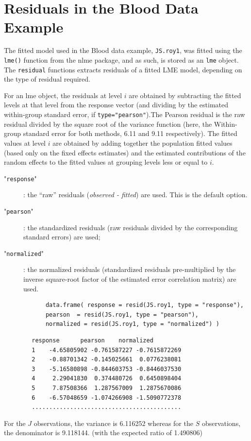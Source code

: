 \documentclass[12pt, a4paper]{report}
\theoremstyle{plain}
\theoremstyle{definition}
\theoremstyle{remark}
\begin{document}
		\section{Residuals in the Blood Data Example}
		The fitted model used in the Blood data example, \texttt{JS.roy1}, was fitted using the \texttt{lme()} function from the nlme package, and as such, is stored as an \texttt{lme} object. The \texttt{residual} functions extracts residuals of a fitted LME model, depending on the type of residual required.
		
		For an lme object, the residuals at level $i$ are obtained by subtracting the fitted levels at that level from the response vector (and dividing by the estimated within-group standard error, if \texttt{type="pearson"}).The Pearson residual is the raw residual divided by the square root of the variance function (here, the Within-group standard error for both methods, 6.11 and 9.11 respectively). The fitted values at level $i$ are obtained by adding together the population fitted values (based only on the fixed effects estimates) and the estimated contributions of the random effects to the fitted values at grouping levels less or equal to $i$.
		
		\begin{description}
			\item["\texttt{response}"]: the “raw” residuals (\textit{observed - fitted}) are used. This is the default option.
			\item["\texttt{pearson}"]: the standardized residuals (raw residuals divided by the corresponding standard errors) are used; 
			\item["\texttt{normalized}"]: the normalized residuals (standardized residuals pre-multiplied by the inverse square-root factor of the estimated error correlation matrix) are used.
		\end{description}
		
		\begin{framed}
			\begin{verbatim}
			data.frame( response = resid(JS.roy1, type = "response"), 
			pearson  = resid(JS.roy1, type = "pearson"), 
			normalized = resid(JS.roy1, type = "normalized") )
			\end{verbatim}
		\end{framed}
		
		\begin{verbatim}
		response      pearson    normalized
		1    -4.65805902 -0.761587227 -0.7615872269
		2    -0.88701342 -0.145025661  0.0776238081
		3    -5.16580898 -0.844603753 -0.8446037530
		4     2.29041830  0.374480726  0.6450898404
		5     7.87508366  1.287567009  1.2875670086
		6    -6.57048659 -1.074266908 -1.5090772378
		...........................................
		\end{verbatim}
		For the $J$ observations, the variance is 6.116252 whereas for the $S$ observations, the denominator is 9.118144. (with the expected ratio of  1.490806)
		
\end{document}
